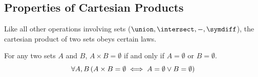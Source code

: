 \subsection{Properties of Cartesian Products}
Like all other operations involving sets (\( \union, \intersect, -, \symdiff\)), the cartesian product of two sets
obeys certain laws.

\begin{thm}
    \label{thm:non-empty-sets-have-non-empty-cartesian-products}
    For any two sets \( A \) and \( B \), \( A \times B = \emptyset \) if and only if \( A = \emptyset \)
    or \( B = \emptyset \).
    \begin{equation*}
        \forall A,B \, \mleft( A \times B = \emptyset \iff A = \emptyset \lor B = \emptyset \mright)
    \end{equation*}
\end{thm}

